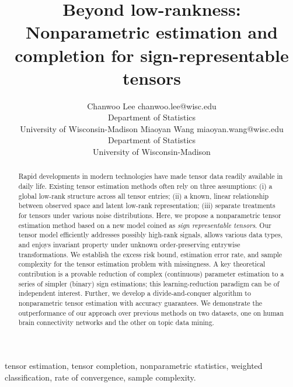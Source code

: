 \documentclass[twoside,11pt]{article}
\theoremstyle{definition}
\begin{document}
\title{Beyond low-rankness: Nonparametric estimation and completion for sign-representable tensors}

\author{\name Chanwoo Lee  \email chanwoo.lee@wisc.edu \\
       \addr Department of Statistics\\
       University of Wisconsin-Madison
       \AND
       \name Miaoyan Wang \email miaoyan.wang@wisc.edu \\
       \addr Department of Statistics\\
       University of Wisconsin-Madison}

\editor{}

\maketitle

\begin{abstract}
Rapid developments in modern technologies have made tensor data readily available in daily life.
Existing tensor estimation methods often rely on three assumptions: (i) a global low-rank structure across all tensor entries; (ii) a known, linear relationship between observed space and latent low-rank representation; (iii) separate treatments for tensors under various noise distributions. Here, we propose a nonparametric tensor estimation method based on a new model coined as \emph{sign representable tensors}. Our tensor model efficiently addresses possibly high-rank signals, allows various data types, and enjoys invariant property under unknown order-preserving entrywise transformations. We establish the excess risk bound, estimation error rate, and sample complexity for the tensor estimation problem with missingness. A key theoretical contribution is a provable reduction of complex (continuous) parameter estimation to a series of simpler (binary) sign estimations; this learning-reduction paradigm can be of independent interest. Further, we develop a divide-and-conquer algorithm to nonparametric tensor estimation with accuracy guarantees. We demonstrate the outperformance of our approach over previous methods on two datasets, one on human brain connectivity networks and the other on topic data mining. 
\end{abstract}

\begin{keywords}
tensor estimation, tensor completion, nonparametric statistics, weighted classification, rate of convergence, sample complexity.
\end{keywords}
\end{document}
